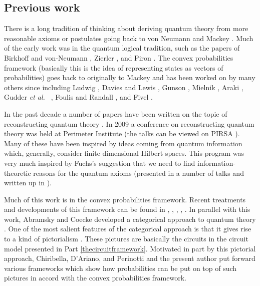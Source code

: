 \documentclass[10pt]{article}
\begin{document}
\subsection{Previous work}

There is a long tradition of thinking about deriving quantum theory from more reasonable axioms or postulates going back to von Neumann \cite{von1996mathematical} and Mackey \cite{mackey1963mathematical}.  Much of the early work was in the quantum logical tradition, such as the papers of Birkhoff and von-Neumann \cite{birkhoff1936logic}, Zierler \cite{zierler1975axioms}, and Piron \cite{piron1964axiomatique}.  The convex probabilities framework (basically this is the idea of representing states as vectors of probabilities) goes back to originally to Mackey and has been worked on by many others since including Ludwig \cite{ludwig1985axiomatic}, Davies and Lewis \cite{davies1970operational}, Gunson \cite{gunson1967algebraic}, Mielnik \cite{mielnik1969theory}, Araki \cite{araki1980characterization}, Gudder {\it et al.\ } \cite{gudder1999convex}, Foulis and Randall \cite{foulis1979empirical}, and Fivel \cite{fivel1994interference}.

In the past decade a number of papers have been written on the topic of reconstructing quantum theory \cite{hardy2001quantum, clifton2003characterizing, d2008probabilistic, wilce2009four, rau2009quantum, rau2010measurement, goyal2008information, dakic2009quantum, masanes2010derivation, goyal2010origin, helland2009steps, fuchs2010quantum, fivel2010derivation, chiribella2010informational}.
In 2009 a conference on reconstructing quantum theory was held at Perimeter Institute (the talks can be viewed on PIRSA \cite{goyal2009reconstructing}).
Many of these have been inspired by ideas coming from quantum information which, generally, consider finite dimensional Hilbert spaces. This program was very much inspired by Fuchs's suggestion that we need to find information-theoretic reasons for the quantum axioms (presented in a number of talks and written up in \cite{fuchs2002quantum}).

Much of this work is in the convex probabilities framework. Recent treatments and developments of this framework can be found in \cite{hardy2001quantum}, \cite{barrett2007information}, \cite{barnum2011information}, \cite{chiribella2010probabilistic, chiribella2010informational}, \cite{hardy2009foliable,  hardy2009operational, hardy2009operational2, hardy2010formalism}. In parallel with this work, Abramsky and Coecke developed a categorical approach to quantum theory \cite{abramsky2004categorical}.  One of the most salient features of the categorical approach is that it gives rise to a kind of pictorialism \cite{coecke2010quantum}.  These pictures are basically the circuits in the circuit model presented in Part \ref{thecircuitframework}.   Motivated in part by this pictorial approach, Chiribella, D'Ariano, and Perinotti \cite{chiribella2010probabilistic, chiribella2010informational} and the present author \cite{hardy2009foliable, hardy2009operational, hardy2009operational2, hardy2010formalism} put forward various frameworks which show how probabilities can be put on top of such pictures in accord with the convex probabilities framework.
\end{document}
